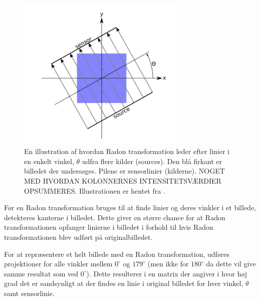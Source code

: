 \begin{figure}[htp]
  \centering
  \includegraphics[width=8cm]{system/illu/radon.png}
  \caption{En illustration af hvordan Radon transformation leder efter linier i en enkelt vinkel, $\theta$ udfra flere kilder (sources). Den blå firkant er billedet der undersøges. Pilene er sensorlinier (kilderne). NOGET MED HVORDAN KOLONNERNES INTENSITETSVÆRDIER OPSUMMERES. Illustrationen er hentet fra \cite{matlab_radon}.}
  \label{fig:radon_transform}
\end{figure}

Før en Radon transformation bruges til at finde linier og deres vinkler i et billede, detekteres kanterne i billedet. Dette giver en større chance for at Radon transformationen opfanger linierne i billedet i forhold til hvis Radon transformationen blev udført på originalbilledet.


For at repræsentere et helt billede med en Radon transformation, udføres projektioner for alle vinkler mellem $0^{\circ}$ og $179^{\circ}$ (men ikke for $180^{\circ}$ da dette vil give samme resultat som ved $0^{\circ}$). Dette resulterer i en matrix der angiver i hvor høj grad det er sandsynligt at der findes en linie i original billedet for hver vinkel, $\theta$ samt sensorlinie. %


